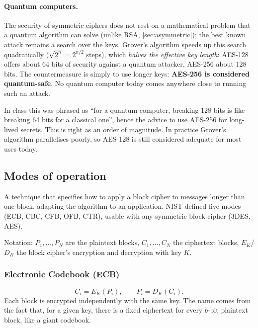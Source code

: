 \paragraph{Quantum computers.} The security of symmetric ciphers does not rest on a mathematical problem that a quantum algorithm can solve (unlike RSA, \cref{sec:asymmetric}); the best known attack remains a search over the keys. Grover's algorithm speeds up this search quadratically ($\sqrt{2^n} = 2^{n/2}$ steps), which \emph{halves the effective key length}: AES-128 offers about 64 bits of security against a quantum attacker, AES-256 about 128 bits. The countermeasure is simply to use longer keys: \textbf{AES-256 is considered quantum-safe}. No quantum computer today comes anywhere close to running such an attack.

\begin{remark}
In class this was phrased as \enquote{for a quantum computer, breaking 128 bits is like breaking 64 bits for a classical one}, hence the advice to use AES-256 for long-lived secrets. This is right as an order of magnitude. In practice Grover's algorithm parallelises poorly, so AES-128 is still considered adequate for most uses today.
\end{remark}

\subsection{Modes of operation}
\label{subsec:modes}

\begin{definition}
A technique that specifies how to apply a block cipher to messages longer than one block, adapting the algorithm to an application. NIST defined five modes (ECB, CBC, CFB, OFB, CTR), usable with any symmetric block cipher (3DES, AES).
\end{definition}

Notation: $P_1,\dots,P_N$ are the plaintext blocks, $C_1,\dots,C_N$ the ciphertext blocks, $E_K$/$D_K$ the block cipher's encryption and decryption with key $K$.

\subsubsection{Electronic Codebook (ECB)}

\[
    C_i = E_K(P_i), \qquad P_i = D_K(C_i).
\]
Each block is encrypted independently with the same key. The name comes from the fact that, for a given key, there is a fixed ciphertext for every $b$-bit plaintext block, like a giant codebook.

